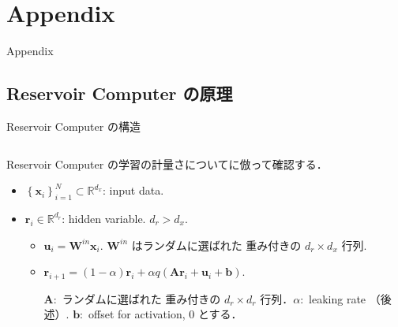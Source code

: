 \section{Appendix}

\begin{frame}
    \begin{center}
        \LARGE Appendix
    \end{center}
\end{frame}



\subsection{Reservoir Computer の原理}
\begin{frame}{Reservoir Computer の構造}
    \begin{columns}[T] %
  
        \begin{column}{.5\textwidth}
            Reservoir Computer の学習の計量さについて\cite{Bollt}に倣って確認する．
            \begin{itemize}
                \item $\left\{\mathbf{x}_i\right\}_{i=1}^N \subset \mathbb{R}^{d_x}$: input data.
                \item $\mathbf{r}_i \in \mathbb{R}^{d_r}$: hidden variable. $d_r>d_x$. \begin{itemize}
                    \item $\mathbf{u}_i=\mathbf{W}^{i n} \mathbf{x}_i$. $\mathbf{W}^{i n}$ はランダムに選ばれた 重み付きの $d_r \times d_x$ 行列. 
                    \item $\mathbf{r}_{i+1}=(1-\alpha) \mathbf{r}_i+\alpha q\left(\mathbf{A r}_i+\mathbf{u}_i+\mathbf{b}\right)$. 
                    
                    $\mathbf{A}:$ ランダムに選ばれた 重み付きの $d_r \times d_r$ 行列．$\alpha:$ leaking rate （後述）. $\mathbf{b}:$ offset for activation, $0$ とする．
                    

\end{itemize}
\end{itemize}
\end{column}
\end{columns}
\end{frame}
